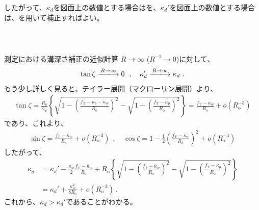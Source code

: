 したがって、$\kappa_d$を図面上の数値とする場合はを、$\kappa_d'$を図面上の数値とする場合は、を用いて補正すればよい。


\clearpage
~\vfill
\begin{Column}{測定における溝深さ補正の近似計算}
$R\to\infty$ ($R^{-1}\to0$)に対して、
\begin{align*}
  \tan\zeta \xlongrightarrow{R\to\infty} 0~~, \quad
  \kappa_d' \xlongrightarrow{R\to\infty} \kappa_d\ .
\end{align*}
もう少し詳しく見ると、テイラー展開（マクローリン展開）より、
\begin{align*}
  \tan\zeta
  = \frac{R_\mathrm o}{\kappa_w}
     \left\{
     \sqrt{1-\left(\frac{f_\mathrm T-\kappa_p-\kappa_w}{R_\mathrm o}\right)^2}
     -\sqrt{1-\left(\frac{f_\mathrm T-\kappa_p}{R_\mathrm o}\right)^2}
     \right\}
  = \frac{f_\mathrm T-\bar\kappa_w}{R_\mathrm o}+o\left(R_\mathrm o^{-3}\right)
\end{align*}
であり、これより、
\begin{align*}
  \sin\zeta = \frac{f_\mathrm T-\bar\kappa_w}{R_\mathrm o}+o\left(R_\mathrm o^{-3}\right)~~, \quad
  \cos\zeta = 1-\frac12\left(\frac{f_\mathrm T-\bar\kappa_w}{R_\mathrm o}\right)^2
              +o\left(R_\mathrm o^{-4}\right)
\end{align*}
したがって、
\begin{align*}
  \kappa_d
  &= \kappa_d'-\frac{\kappa_w}2\frac{f_\mathrm T-\bar\kappa_w}{R_\mathrm o}
     +R_\mathrm o
      \left\{
      \sqrt{1-\left(\frac{f_\mathrm T-\bar\kappa_w}{R_\mathrm o}\right)^2}
      -\sqrt{1-\left(\frac{f_\mathrm T-\kappa_p}{R_\mathrm o}\right)^2}
      \right\}\\
  &= \kappa_d'+\frac{\kappa_w^2}{8R_\mathrm o}
     +o\left(R_\mathrm o^{-3}\right)\ .
\end{align*}
これから、$\kappa_d > \kappa_d'$であることがわかる。
\end{Column}






